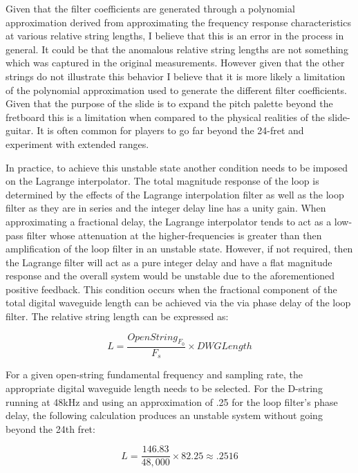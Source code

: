 \documentclass[../main.tex]{subfiles}
\begin{document}
Given that the filter coefficients are generated through a polynomial approximation derived from approximating the frequency response characteristics at various relative string lengths, I believe that this is an error in the process in general. It could be that the anomalous relative string lengths are not something which was captured in the original measurements. However given that the other strings do not illustrate this behavior I believe that it is more likely a limitation of the polynomial approximation used to generate the different filter coefficients. Given that the purpose of the slide is to expand the pitch palette beyond the fretboard this is a limitation when compared to the physical realities of the slide-guitar. It is often common for players to go far beyond the 24-fret and experiment with extended ranges.

In practice, to achieve this unstable state another condition needs to be imposed on the Lagrange interpolator. The total magnitude response of the loop is determined by the effects of the Lagrange interpolation filter as well as the loop filter as they are in series and the integer delay line has a unity gain. When approximating a fractional delay, the Lagrange interpolator tends to act as a low-pass filter whose attenuation at the higher-frequencies is greater than then amplification of the loop filter in an unstable state. However, if not required, then the Lagrange filter will act as a pure integer delay and have a flat magnitude response and the overall system would be unstable due to the aforementioned positive feedback. This condition occurs when the fractional component of the total digital waveguide length can be achieved via the via phase delay of the loop filter. The relative string length can be expressed as:

\begin{equation}
    L = \frac{OpenString_{F_0}}{F_s} \times DWGLength    
\end{equation}

For a given open-string fundamental frequency and sampling rate, the appropriate digital waveguide length needs to be selected. For the D-string running at 48kHz and using an approximation of .25 for the loop filter's phase delay, the following calculation produces an unstable system without going beyond the 24th fret:

\begin{equation}
    L = \frac{146.83}{48,000} \times 82.25 \approx .2516
\end{equation}
\end{document}
